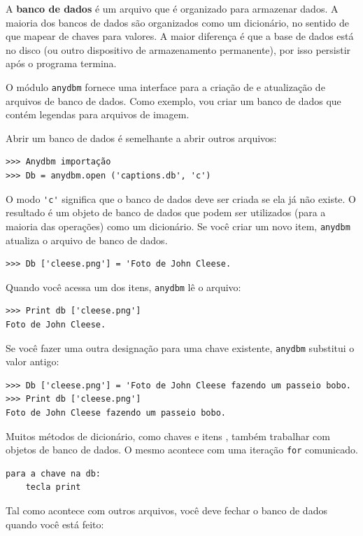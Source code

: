 \documentclass[10pt]{book}
\begin{document}
\begin{v erbatim}
A {\bf banco de dados} é um arquivo que é organizado para armazenar dados.
A maioria dos bancos de dados são organizados como um dicionário, no sentido de
que mapear de chaves para valores. A maior diferença
é que a base de dados está no disco (ou outro dispositivo de armazenamento permanente),
por isso persistir após o programa termina.

O módulo {\tt anydbm} fornece uma interface para a criação de
e atualização de arquivos de banco de dados. Como exemplo, vou criar um banco de dados
que contém legendas para arquivos de imagem.

Abrir um banco de dados é semelhante a abrir outros arquivos:

\begin{verbatim}
>>> Anydbm importação
>>> Db = anydbm.open ('captions.db', 'c')
\end{verbatim}
%
O modo \verb "'c'" significa que o banco de dados deve ser criada se
ela já não existe. O resultado é um objeto de banco de dados
que podem ser utilizados (para a maioria das operações) como um dicionário.
Se você criar um novo item, {\tt anydbm} atualiza o arquivo de banco de dados.


\begin{verbatim}
>>> Db ['cleese.png'] = 'Foto de John Cleese.
\end{verbatim}
%
Quando você acessa um dos itens, {\tt anydbm} lê o arquivo:

\begin{verbatim}
>>> Print db ['cleese.png']
Foto de John Cleese.
\end{verbatim}
%
Se você fazer uma outra designação para uma chave existente, {\tt anydbm} substitui
o valor antigo:

\begin{verbatim}
>>> Db ['cleese.png'] = 'Foto de John Cleese fazendo um passeio bobo.
>>> Print db ['cleese.png']
Foto de John Cleese fazendo um passeio bobo.
\end{verbatim}
%
Muitos métodos de dicionário, como chaves {\tt} e {itens \tt}, também
trabalhar com objetos de banco de dados. O mesmo acontece com uma iteração {\tt for}
comunicado.

\begin{verbatim}
para a chave na db:
    tecla print
\end{verbatim}
%
Tal como acontece com outros arquivos, você deve fechar o banco de dados quando você está
feito:


\end{v erbatim}
\end{document}

